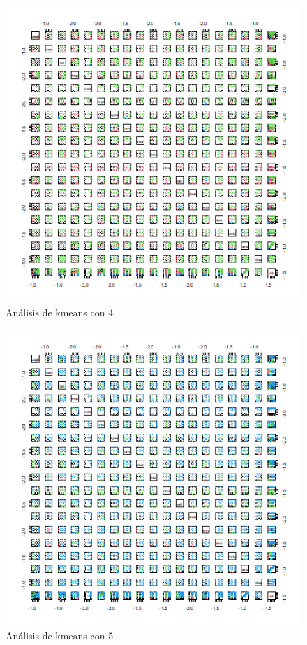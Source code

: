 \documentclass[a4paper,10pt,twocolumn]{article}
\begin{document}
\begin{figure}[htb]%
	\begin{center}
		\includegraphics[width=\linewidth]{kmeans_cluster_4}
	\end{center}
	\caption{Análisis de kmeans con 4 \label{fig:kmeans_cluster_4}}%
\end{figure}

\begin{figure}[htb]%
	\begin{center}
		\includegraphics[width=\linewidth]{kmeans_cluster_5}
	\end{center}
	\caption{Análisis de kmeans con 5 \label{fig:kmeans_cluster_5}}%
\end{figure}
\end{document}
